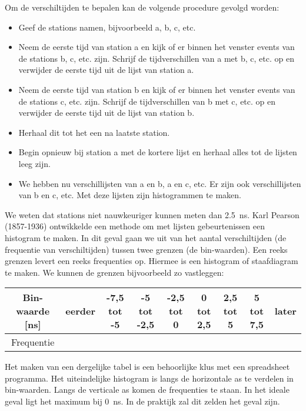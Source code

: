 Om de verschiltijden te bepalen kan de volgende procedure gevolgd
worden:
\begin{itemize}
    \item Geef de stations namen, bijvoorbeeld a, b, c, etc.
    \item Neem de eerste tijd van station a en kijk of er binnen het
    venster events van de stations b, c, etc. zijn. Schrijf de
    tijdverschillen van a met b, c, etc. op en verwijder de eerste tijd
    uit de lijst van station a.
    \item Neem de eerste tijd van station b en kijk of er binnen het
    venster events van de stations c, etc. zijn. Schrijf de
    tijdverschillen van b met c, etc. op en verwijder de eerste tijd uit
    de lijst van station b.
    \item Herhaal dit tot het een na laatste station.
    \item Begin opnieuw bij station a met de kortere lijst en herhaal
    alles tot de lijsten leeg zijn.
    \item We hebben nu verschillijsten van a en b, a en c, etc. Er zijn
    ook verschillijsten van b en c, etc. Met deze lijsten zijn
    histogrammen te maken. 
\end{itemize}
We weten dat stations niet nauwkeuriger kunnen meten dan
\SI{2,5}{\nano\second}. Karl Pearson (1857-1936) \cite{wiki} ontwikkelde
een methode om met lijsten gebeurtenissen een histogram te maken. In dit
geval gaan we uit van het aantal verschiltijden (de frequentie van
verschiltijden) tussen twee grenzen (de bin-waarden). Een reeks grenzen
levert een reeks frequenties op. Hiermee is een histogram of
staafdiagram te maken. We kunnen de grenzen bijvoorbeeld zo vastleggen:

\bigskip{}
\begin{tabular}{|c|c|c|c|c|c|c|c|c|}
    \hline 
    Bin-waarde {[}ns{]} & eerder & -7,5 tot -5 & -5 tot -2,5 & -2,5 tot 0 & 0 tot 2,5 & 2,5 tot 5 & 5 tot 7,5 & later\tabularnewline
    \hline 
    Frequentie &  &  &  &  &  &  &  & \tabularnewline
    \hline 
\end{tabular}

\bigskip{}

Het maken van een dergelijke tabel is een behoorlijke klus met een
spreadsheet programma. Het uiteindelijke histogram is langs de horizontale
as te verdelen in bin-waarden. Langs de verticale as komen de frequenties
te staan. In het ideale geval ligt het maximum bij \SI{0}{\nano\second}.
In de praktijk zal dit zelden het geval zijn.

